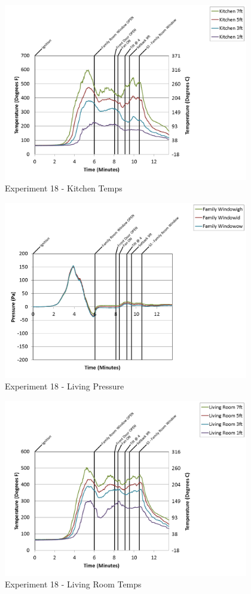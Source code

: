 \documentclass{article}
\begin{document}
\begin{appendices}
\clearpage

\begin{figure}[h!]
	\centering
	\includegraphics[height=3.05in]{0_Images/Results_Charts/Exp_18_Charts/KitchenTemps.png}
	\caption{Experiment 18 - Kitchen Temps}
\end{figure}


\begin{figure}[h!]
	\centering
	\includegraphics[height=3.05in]{0_Images/Results_Charts/Exp_18_Charts/LivingPressure.png}
	\caption{Experiment 18 - Living Pressure}
\end{figure}

\clearpage

\begin{figure}[h!]
	\centering
	\includegraphics[height=3.05in]{0_Images/Results_Charts/Exp_18_Charts/LivingRoomTemps.png}
	\caption{Experiment 18 - Living Room Temps}
\end{figure}



\end{appendices}
\end{document}
